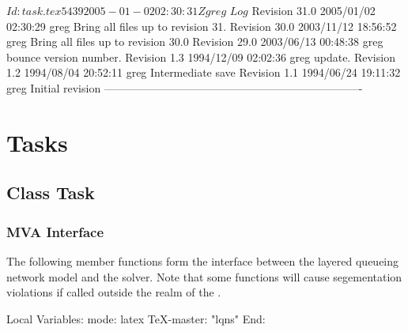 \C 
\C $Id: task.tex 5439 2005-01-02 02:30:31Z greg $
\C 
\C $Log$
\C Revision 31.0  2005/01/02 02:30:29  greg
\C Bring all files up to revision 31.
\C
\C Revision 30.0  2003/11/12 18:56:52  greg
\C Bring all files up to revision 30.0
\C
\C Revision 29.0  2003/06/13 00:48:38  greg
\C bounce version number.
\C
\C Revision 1.3  1994/12/09 02:02:36  greg
\C update.
\C
\C Revision 1.2  1994/08/04  20:52:11  greg
\C Intermediate save
\C
\C Revision 1.1  1994/06/24  19:11:32  greg
\C Initial revision
\C
\C ----------------------------------------------------------------------
\section{Tasks}
\label{sec:task}

\subsection{Class Task}

\label{sec:task-mva}
\subsubsection{MVA Interface}

The following member functions form the interface between the layered
queueing network model and the  solver.  Note that
some functions will cause segementation violations if called outside
the realm of the .

\label{sec:task-makeClient}
\label{sec:task-saveClientResults}

\C Local Variables: 
\C mode: latex
\C TeX-master: "lqns"
\C End: 
